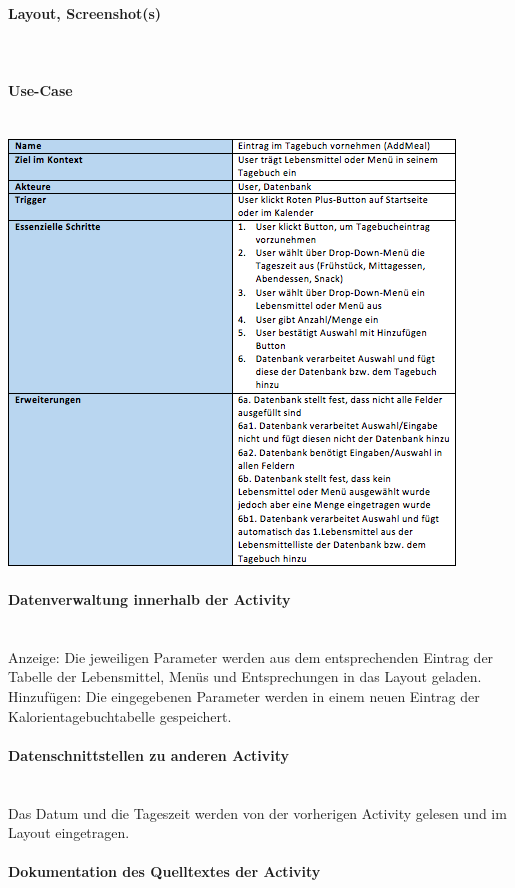 \paragraph{Layout, Screenshot(s)}\\
\paragraph{Use-Case}$~~$\\
\newline
\includegraphics[scale=1]{img/usecaseaddmeal}\\
\paragraph{Datenverwaltung innerhalb der Activity}\\
Anzeige: Die jeweiligen Parameter werden aus dem entsprechenden Eintrag der Tabelle der Lebensmittel, Menüs und Entsprechungen in das Layout geladen. 
Hinzufügen: Die eingegebenen Parameter werden in einem neuen Eintrag der Kalorientagebuchtabelle gespeichert. 
\paragraph{Datenschnittstellen zu anderen Activity}\\
Das Datum und die Tageszeit werden von der vorherigen Activity gelesen und im Layout eingetragen.  
\paragraph{Dokumentation des Quelltextes der Activity}\\


